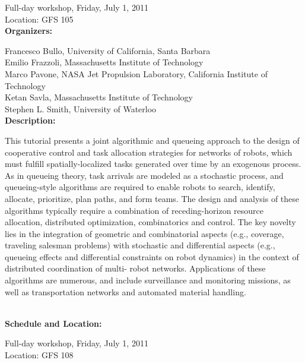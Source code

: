 {Full-day workshop, Friday, July 1, 2011\\
Location: GFS 105 \\[4mm]

{\bf  Organizers:}

Francesco Bullo, University of California, Santa Barbara\\
Emilio Frazzoli, Massachusetts Institute of Technology\\
Marco Pavone, NASA Jet Propulsion Laboratory, California Institute of Technology\\
Ketan Savla, Massachusetts Institute of Technology\\
Stephen L. Smith, University of Waterloo\\[4mm]


{\bf Description: }

This tutorial presents a joint algorithmic and queueing approach to the design of cooperative control and task allocation strategies for networks of robots, which must fulfill spatially-localized tasks generated over time by an exogenous process. As in queueing theory, task arrivals are modeled as a stochastic process, and queueing-style algorithms are required to enable robots to search, identify, allocate, prioritize, plan paths, and form teams. The design and analysis of these algorithms typically require a combination of receding-horizon resource allocation, distributed optimization, combinatorics and control. The key novelty lies in the integration of geometric and combinatorial aspects (e.g., coverage, traveling salesman problems) with stochastic and differential aspects (e.g., queueing effects and differential constraints on robot dynamics) in the context of distributed coordination of multi- robot networks. Applications of these algorithms are numerous, and include surveillance and monitoring missions, as well as transportation networks and automated material handling.	

\\[5mm]

{\bf  Schedule and Location:}

Full-day workshop, Friday, July 1, 2011\\
Location: GFS 108 \\[4mm]

}
